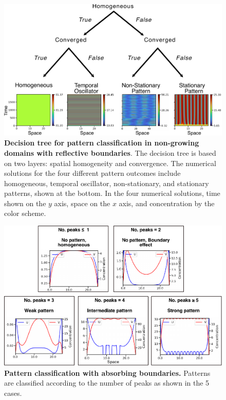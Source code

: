 \documentclass[10pt,letterpaper]{article}
\begin{document}
\begin{figure}[H]
    \includegraphics[width=1\textwidth]{figures/no_growth_classification}
    \vspace{5pt}
    \caption{{\bf Decision tree for pattern classification in non-growing domains with reflective boundaries}. The decision tree is based on two layers: spatial homogeneity and convergence. The numerical solutions for the four different pattern outcomes include homogeneous, temporal oscillator, non-stationary, and stationary patterns, shown at the bottom. In the four numerical solutions, time shown on the $y$ axis, space on the $x$ axis, and concentration by the color scheme.}
    \label{sup_fig2}
\end{figure}


\begin{figure}[H]
    \includegraphics[width=1\textwidth]{figures/growth_classification}
    \vspace{5pt}

    \caption{{\bf Pattern classification with absorbing boundaries.} Patterns are classified according to the number of peaks as shown in the 5 cases.}
    \label{sup_fig3}
\end{figure}
\end{document}
